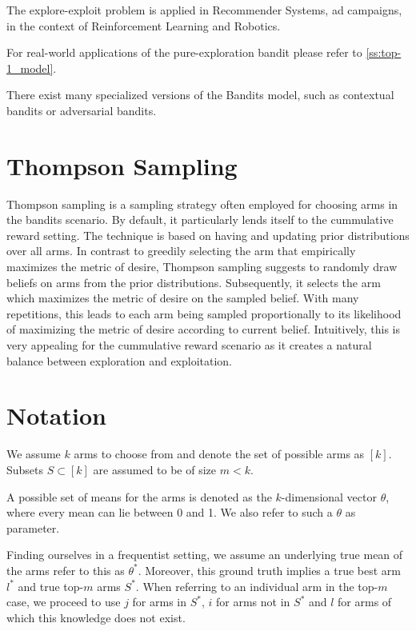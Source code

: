 The explore-exploit problem is applied in Recommender Systems, ad campaigns, in the context of Reinforcement Learning and Robotics.

For real-world applications of the pure-exploration bandit please refer to \ref{ss:top-1_model}.

There exist many specialized versions of the Bandits model, such as contextual bandits or adversarial bandits.

\section{Thompson Sampling}

Thompson sampling is a sampling strategy often employed for choosing arms in the bandits scenario. By default, it particularly lends itself to the cummulative reward setting. The technique is based on having and updating prior distributions over all arms. In contrast to greedily selecting the arm that empirically maximizes the metric of desire, Thompson sampling suggests to randomly draw beliefs on arms from the prior distributions. Subsequently, it selects the arm which maximizes the metric of desire on the sampled belief.
With many repetitions, this leads to each arm being sampled proportionally to its likelihood of maximizing the metric of desire according to current belief.
Intuitively, this is very appealing for the cummulative reward scenario as it creates a natural balance between exploration and exploitation.


\section{Notation}
We assume $k$ arms to choose from and denote the set of possible arms as $[k]$. Subsets $S \subset [k]$ are assumed to be of size $m < k$.

A possible set of means for the arms is denoted as the $k$-dimensional vector $\theta$, where every mean can lie between 0 and 1. We also refer to such a $\theta$ as parameter.

Finding ourselves in a frequentist setting, we assume an underlying true mean of the arms refer to this as $\theta^*$. Moreover, this ground truth implies a true best arm $l^*$ and true top-$m$ arms $S^*$. When referring to an individual arm in the top-$m$ case, we proceed to use $j$ for arms in $S^*$, $i$ for arms not in $S^*$ and $l$ for arms of which this knowledge does not exist.

